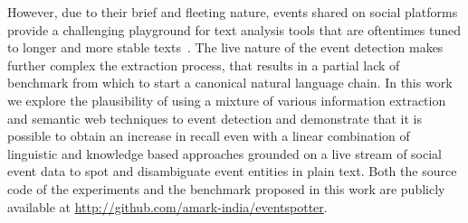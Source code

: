 \documentclass[10pt,a4paper]{article}
\begin{document}
However, due to their brief and fleeting nature, events shared on social platforms provide a challenging playground for text analysis tools that are oftentimes tuned to longer and more stable texts~\cite{ERP:2013}.
The live nature of the event detection makes further complex the extraction process, that results in a partial lack of benchmark from which to start a canonical natural language chain. In this work we explore the plausibility of using a mixture of various information extraction and semantic web techniques to event detection and demonstrate that it is possible to obtain an increase in recall even with a linear combination of linguistic and knowledge based approaches grounded on a live stream of social event data to spot and disambiguate event entities in plain text. Both the source code of the experiments and the benchmark proposed in this work are publicly available at \url{http://github.com/amark-india/eventspotter}.
\end{document}
